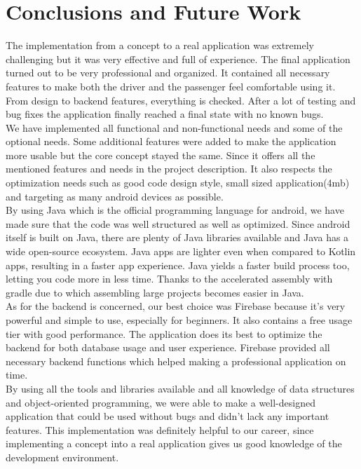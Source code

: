 \chapter{Conclusions and Future Work}\label{chap:conclusions}

The implementation from a concept to a real application was extremely challenging but it was very effective and full of experience. The final application turned out to be very professional and organized. It contained all necessary features to make both the driver and the passenger feel comfortable using it. From design to backend features, everything is checked. After a lot of testing and bug fixes the application finally reached a final state with no known bugs.\\

We have implemented all functional and non-functional needs and some of the optional needs. Some additional features were added to make the application more usable but the core concept stayed the same. Since it offers all the mentioned features and needs in the project description. It also respects the optimization needs such as good code design style, small sized application(4mb) and targeting as many android devices as possible.\\

By using Java which is the official programming language for android, we have made sure that the code was well structured as well as optimized. Since android itself is built on Java, there are plenty of Java libraries available and Java has a wide open-source ecosystem. Java apps are lighter even when compared to Kotlin apps, resulting in a faster app experience. Java yields a faster build process too, letting you code more in less time. Thanks to the accelerated assembly with gradle due to which assembling large projects becomes easier in Java.\\

As for the backend is concerned, our best choice was Firebase because it’s very powerful and simple to use, especially for beginners. It also contains a free usage tier with good performance. The application does its best to optimize the backend for both database usage and user experience. Firebase provided all necessary backend functions which helped making a professional application on time.\\
 
By using all the tools and libraries available and all knowledge of data structures and object-oriented programming, we were able to make a well-designed application that could be used without bugs and didn’t lack any important features. This implementation was definitely helpful to our career, since implementing a concept into a real application gives us good knowledge of the development environment.\\

